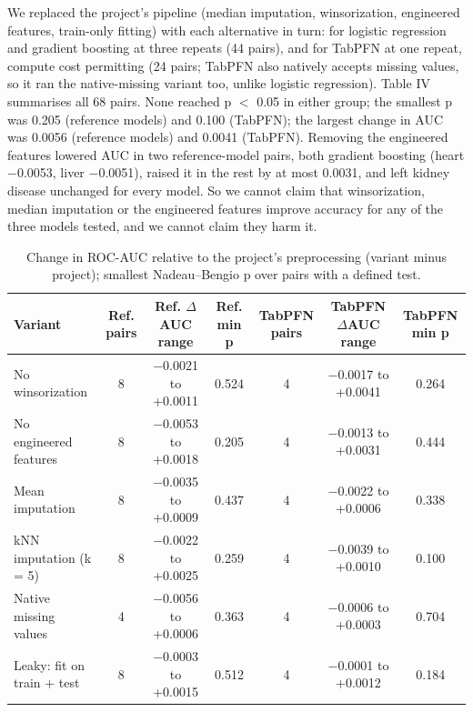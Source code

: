 \documentclass[conference]{IEEEtran}
\begin{document}
We replaced the project's pipeline (median imputation, winsorization, engineered features, train-only fitting) with each alternative in turn: for logistic regression and gradient boosting at three repeats (44 pairs), and for TabPFN at one repeat, compute cost permitting (24 pairs; TabPFN also natively accepts missing values, so it ran the native-missing variant too, unlike logistic regression). Table IV summarises all 68 pairs. None reached p $<$ 0.05 in either group; the smallest p was 0.205 (reference models) and 0.100 (TabPFN); the largest change in AUC was 0.0056 (reference models) and 0.0041 (TabPFN). Removing the engineered features lowered AUC in two reference-model pairs, both gradient boosting (heart $-$0.0053, liver $-$0.0051), raised it in the rest by at most 0.0031, and left kidney disease unchanged for every model. So we cannot claim that winsorization, median imputation or the engineered features improve accuracy for any of the three models tested, and we cannot claim they harm it.

\begin{table}[!t]
\caption{Change in ROC-AUC relative to the project's preprocessing (variant minus project); smallest Nadeau--Bengio p over pairs with a defined test.}
\label{tab:preproc}
\centering\footnotesize
\begin{tabularx}{\textwidth}{>{\raggedright\arraybackslash}Xcccccc}
\toprule
\textbf{Variant} & \textbf{Ref. pairs} & \textbf{Ref. $\Delta$AUC range} & \textbf{Ref. min p} & \textbf{TabPFN pairs} & \textbf{TabPFN $\Delta$AUC range} & \textbf{TabPFN min p} \\
\midrule
No winsorization & 8 & $-$0.0021 to +0.0011 & 0.524 & 4 & $-$0.0017 to +0.0041 & 0.264 \\
No engineered features & 8 & $-$0.0053 to +0.0018 & 0.205 & 4 & $-$0.0013 to +0.0031 & 0.444 \\
Mean imputation & 8 & $-$0.0035 to +0.0009 & 0.437 & 4 & $-$0.0022 to +0.0006 & 0.338 \\
kNN imputation (k = 5) & 8 & $-$0.0022 to +0.0025 & 0.259 & 4 & $-$0.0039 to +0.0010 & 0.100 \\
Native missing values & 4 & $-$0.0056 to +0.0006 & 0.363 & 4 & $-$0.0006 to +0.0003 & 0.704 \\
Leaky: fit on train + test & 8 & $-$0.0003 to +0.0015 & 0.512 & 4 & $-$0.0001 to +0.0012 & 0.184 \\
\bottomrule
\end{tabularx}
\end{table}
\end{document}
